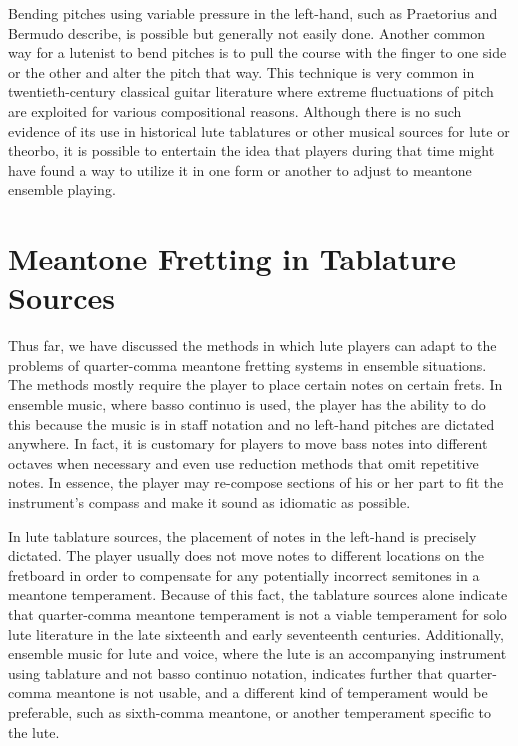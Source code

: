 Bending pitches using variable pressure in the left-hand, such as Praetorius and Bermudo
describe, is possible but generally not easily done.  Another common way for a lutenist to
bend pitches is to pull the course with the finger to one side or the other and alter the
pitch that way. This technique is very common in twentieth-century classical guitar
literature where extreme fluctuations of pitch are exploited for various compositional
reasons. Although there is no such evidence of its use in historical lute tablatures or
other musical sources for lute or theorbo, it is possible to entertain the idea that
players during that time might have found a way to utilize it in one form or another to
adjust to meantone ensemble playing.

\section{Meantone Fretting in Tablature Sources}

Thus far, we have discussed the methods in which lute players can adapt to the problems
of quarter-comma meantone fretting systems in ensemble situations.  The methods mostly
require the player to place certain notes on certain frets.  In ensemble music, where
basso continuo is used, the player has the ability to do this because the music is in
staff notation and no left-hand pitches are dictated anywhere.  In fact, it is
customary for players to move bass notes into different octaves when necessary and even
use reduction methods that omit repetitive notes.  In essence, the player may
re-compose sections of his or her part to fit the instrument's compass and make it
sound as idiomatic as possible.

In lute tablature sources, the placement of notes in the left-hand is precisely
dictated. The player usually does not move notes to different locations on the
fretboard in order to compensate for any potentially incorrect semitones in a
meantone temperament.  Because of this fact, the tablature sources alone
indicate that quarter-comma meantone temperament is not a viable temperament for
solo lute literature in the late sixteenth and early seventeenth centuries.
Additionally, ensemble music for lute and voice, where the lute is an
accompanying instrument using tablature and not basso continuo notation,
indicates further that quarter-comma meantone is not usable, and a different
kind of temperament would be preferable, such as sixth-comma meantone, or
another temperament specific to the lute.

